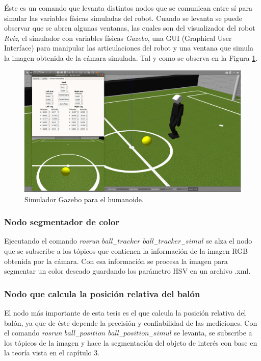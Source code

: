 		Éste es un comando que levanta distintos nodos que se comunican entre sí para simular las variables físicas simuladas del robot. Cuando se levanta se puede observar que se abren algunas ventanas, las cuales son del visualizador del robot \textit{Rviz}, el simulador con variables físicas \textit{Gazebo}, una GUI (Graphical User Interface) para manipular las articulaciones del robot y una ventana que simula la imagen obtenida de la cámara simulada. Tal y como se observa en la Figura \ref{fig:gazebo}.
		
\begin{figure}
	\centering
	\includegraphics[scale=0.2]{images/gazebo.png}
	\caption{Simulador Gazebo para el humanoide.}
	\label{fig:gazebo}
\end{figure} 
		
			\subsubsection*{Nodo segmentador de color}
			Ejecutando el comando \textit{rosrun $ball_-tracker$ $ball_-tracker_-simul$} se alza el nodo que se subscribe a los tópicos que contienen la información de la imagen RGB obtenida por la cámara. Con esa información se procesa la imagen para segmentar un color deseado guardando los parámetro HSV en un archivo .xml.
			
			\subsubsection*{Nodo que calcula la posición relativa del balón}
			El nodo más importante de esta tesis es el que calcula la posición relativa del balón, ya que de éste depende la precisión y confiabilidad de las mediciones. Con el comando \textit{rosrun $ball_-position$ $ball_-position_-simul$} se levanta, se subscribe a los tópicos de la imagen y hace la segmentación del objeto de interés con base en la teoría vista en el capítulo 3. 
			
